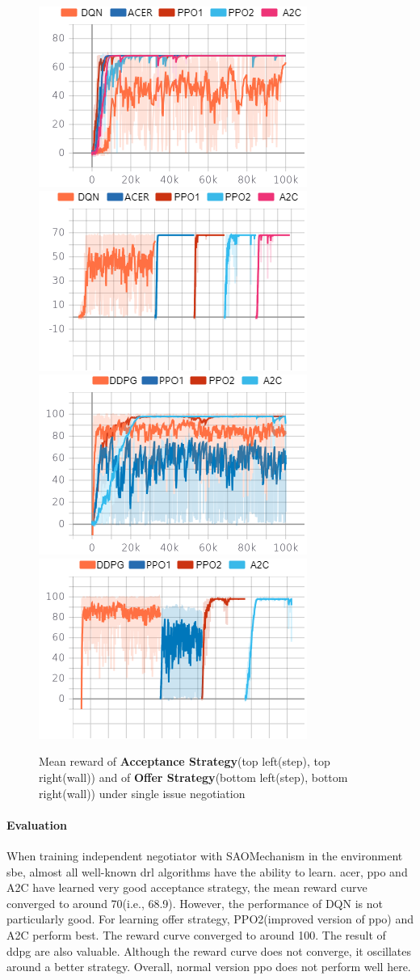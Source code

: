 \begin{figure}
    \includegraphics[width=.44\textwidth]{./images/ac_s.png}\hfill
    \includegraphics[width=.44\textwidth]{./images/ac_s_wall.png}
    \\[\smallskipamount]
    \includegraphics[width=.44\textwidth]{./images/of_s.png}\hfill
    \includegraphics[width=.44\textwidth]{./images/of_s_wall.png}
    \caption{Mean reward of \textbf{Acceptance Strategy}(top left(step), top right(wall)) and of \textbf{Offer Strategy}(bottom left(step), bottom right(wall)) under single issue negotiation}
		\label{fig:single-issue}
\end{figure}

\paragraph{Evaluation} When training independent negotiator with SAOMechanism in the environment \gls{sbe}, almost all well-known \gls{drl} algorithms have the ability to learn. \gls{acer}, \gls{ppo} and A2C have learned very good acceptance strategy, the mean reward curve converged to around 70(i.e., 68.9). However, the performance of DQN is not particularly good. For learning offer strategy, PPO2(improved version of \gls{ppo}) and A2C perform best. The reward curve converged to around 100. The result of \gls{ddpg} are also valuable. Although the reward curve does not converge, it oscillates around a better strategy. Overall, normal version \gls{ppo} does not perform well here. 

